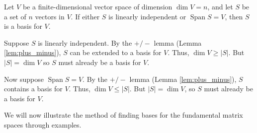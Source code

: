 \documentclass[12pt,letterpaper,reqno]{article}
\numberwithin{equation}{section}
\DeclareMathOperator{\Span}{Span}
\begin{document}
\begin{thm}\label{thm:counting_argument}
	Let $V$ be a finite-dimensional vector space of dimension $\dim V=n$, and let $S$ be a set of $n$ vectors in $V$. If either $S$ is linearly independent or $\Span S=V$, then $S$ is a basis for $V$.
\end{thm}

\begin{pf}
Suppose $S$ is linearly independent. By the $+/-$ lemma (Lemma \ref{lem:plus_minus}), $S$ can be extended to a basis for $V$. Thus, $\dim V \geq |S|$. But $|S|=\dim V$ so $S$ must already be a basis for $V$.

Now suppose $\Span S=V$. By the $+/-$ lemma (Lemma \ref{lem:plus_minus}), $S$ contains a basis for $V$. Thus, $\dim V \leq |S|$. But $|S|=\dim V$, so $S$ must already be a basis for $V$.	
\end{pf}

We will now illustrate the method of finding bases for the fundamental matrix spaces through examples.
\end{document}
